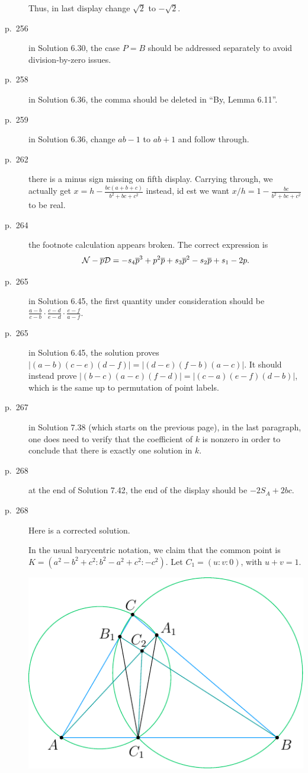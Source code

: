\documentclass[11pt]{scrartcl}
\begin{document}
\begin{description}
  Thus, in last display change $\sqrt2$ to $-\sqrt2$.
\item[p.\  256] in Solution 6.30, the case $P=B$ should be addressed separately
  to avoid division-by-zero issues.
\item[p.\  258] in Solution 6.36, the comma should be deleted in ``By, Lemma 6.11''.
\item[p.\  259] in Solution 6.36, change $ab-1$ to $ab+1$ and follow through.
\item[p.\  262] there is a minus sign missing on fifth display.
  Carrying through, we actually get $x = h - \frac{bc(a+b+c)}{b^2+bc+c^2}$ instead,
  id est we want $x/h = 1 - \frac{bc}{b^2+bc+c^2}$ to be real.
\item[p.\  264] the footnote calculation appears broken. The correct expression is
  \[ \mathcal{N} - \overline p \mathcal{D}
    = -s_4 \overline p^3 + p^2 \overline p + s_3 \overline p^2 - s_2 \overline p + s_1 - 2 p.  \]
\item[p.\  265] in Solution 6.45, the first quantity under consideration should be
  $\frac{a-b}{c-b}\cdot\frac{c-d}{e-d}\cdot\frac{e-f}{a-f}$.
\item[p.\  265] in Solution 6.45, the solution proves $|(a-b)(c-e)(d-f)|=|(d-e)(f-b)(a-c)|$.
  It should instead prove $|(b-c)(a-e)(f-d)|=|(c-a)(e-f)(d-b)|$,
  which is the same up to permutation of point labels.
\item[p.\ 267] in Solution 7.38 (which starts on the previous page),
  in the last paragraph, one does need to verify that the coefficient of $k$ is nonzero
  in order to conclude that there is exactly one solution in $k$.
\item[p.\  268] at the end of Solution 7.42, the end of the display should be $-2S_A+2bc$.
\item[p.\  268] 
  Here is a corrected solution.

  In the usual barycentric notation,
  we claim that the common point is $K = \left( a^2-b^2+c^2 : b^2-a^2+c^2 : -c^2 \right)$.
  Let $C_1 = (u:v:0)$, with $u+v=1$.
  \begin{center}
    \includegraphics{sharygin-figure.pdf}
  \end{center}


\end{description}
\end{document}
